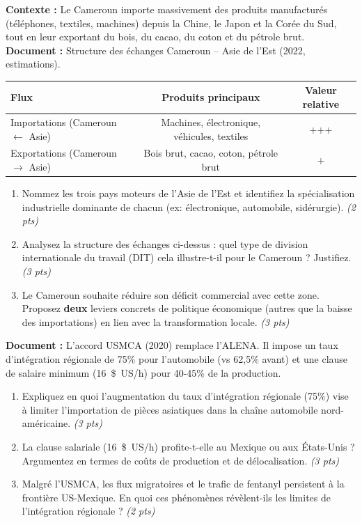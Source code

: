 \documentclass[11pt]{article}
\begin{document}
\begin{exercice}
\label{exo:asie}
\textbf{Contexte :} Le Cameroun importe massivement des produits manufacturés (téléphones, textiles, machines) depuis la Chine, le Japon et la Corée du Sud, tout en leur exportant du bois, du cacao, du coton et du pétrole brut.
\textbf{Document :} Structure des échanges Cameroun -- Asie de l'Est (2022, estimations).

\begin{center}
\begin{tabular}{lcc}
\toprule
Flux & Produits principaux & Valeur relative \\
\midrule
Importations (Cameroun $\leftarrow$ Asie) & Machines, électronique, véhicules, textiles & +++ \\
Exportations (Cameroun $\rightarrow$ Asie) & Bois brut, cacao, coton, pétrole brut & + \\
\bottomrule
\end{tabular}
\end{center}

\begin{enumerate}
\item Nommez les trois pays moteurs de l'Asie de l'Est et identifiez la spécialisation industrielle dominante de chacun (ex: électronique, automobile, sidérurgie). \textit{(2 pts)}
\item Analysez la structure des échanges ci-dessus : quel type de division internationale du travail (DIT) cela illustre-t-il pour le Cameroun ? Justifiez. \textit{(3 pts)}
\item Le Cameroun souhaite réduire son déficit commercial avec cette zone. Proposez \textbf{deux} leviers concrets de politique économique (autres que la baisse des importations) en lien avec la transformation locale. \textit{(3 pts)}
\end{enumerate}
\end{exercice}

\begin{exercice}
\label{exo:amnord}
\textbf{Document :} L'accord USMCA (2020) remplace l'ALENA. Il impose un taux d'intégration régionale de 75\% pour l'automobile (vs 62,5\% avant) et une clause de salaire minimum (\SI{16}{\$US}/h) pour 40-45\% de la production.

\begin{enumerate}
\item Expliquez en quoi l'augmentation du taux d'intégration régionale (75\%) vise à limiter l'importation de pièces asiatiques dans la chaîne automobile nord-américaine. \textit{(3 pts)}
\item La clause salariale (\SI{16}{\$US}/h) profite-t-elle au Mexique ou aux États-Unis ? Argumentez en termes de coûts de production et de délocalisation. \textit{(3 pts)}
\item Malgré l'USMCA, les flux migratoires et le trafic de fentanyl persistent à la frontière US-Mexique. En quoi ces phénomènes révèlent-ils les limites de l'intégration régionale ? \textit{(2 pts)}
\end{enumerate}
\end{exercice}
\end{document}
